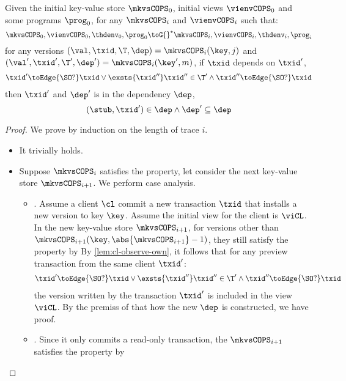 \begin{lemma}
    \label{lem:cops-dep}
    Given the initial key-value store \( \mkvsCOPS_0 \), initial views \( \vienvCOPS_0 \) and some programs \( \prog_0 \), for any \( \mkvsCOPS_i \) and \( \vienvCOPS_i \)  such that: 
    \[
        \mkvsCOPS_0, \vienvCOPS_0, \thdenv_0, \prog_0 {\toG{}}^* \mkvsCOPS_i, \vienvCOPS_i, \thdenv_i, \prog_i 
    \]
    for any versions \( ( \val,\txid,\T,\dep ) = \mkvsCOPS_i(\key,j) \) and \( ( \val',\txid',\T',\dep' ) = \mkvsCOPS_i(\key',m) \), if \( \txid \) depends on \( \txid' \), \ie
    \[
        \begin{array}{@{}l@{}}
            \txid' \toEdge{\SO ?} \txid
            \lor \exsts{\txid''}
            \txid'' \in \T' \land
            \txid'' \toEdge{\SO ?} \txid
        \end{array}
    \]
    then \( \txid' \) and \( \dep' \) is in the dependency \( \dep \), \ie
    \[
        (\stub, \txid') \in \dep \land \dep' \subseteq \dep
    \]
\end{lemma}
\begin{proof}
    We prove by induction on the length of trace \( i \).
    \begin{itemize}
        \item 
        It trivially holds.
        \item  
        Suppose \( \mkvsCOPS_i \) satisfies the property, let consider the next key-value store \( \mkvsCOPS_{i+1}\).
        We perform case analysis.
        \begin{itemize}
            \item 
            .
            Assume a client \( \cl \) commit a new transaction \( \txid \) that installs a new version to key \( \key \).
            Assume the initial view for the client is \( \viCL \).
            In the new key-value store \( \mkvsCOPS_{i+1} \), for versions other than \( \mkvsCOPS_{i+1}(\key, \abs{\mkvsCOPS_{i+1}} - 1 ) \), they still satisfy the property by \ih
            By \cref{lem:cl-observe-own}, it follows that for any preview transaction from the same client \( \txid' \):
            \[
                \begin{array}{@{}l@{}}
                    \txid' \toEdge{\SO ?} \txid
                    \lor \exsts{\txid''}
                    \txid'' \in \T' \land
                    \txid'' \toEdge{\SO ?} \txid
                \end{array}
            \]
            the version written by the transaction \( \txid' \) is included in the view \( \viCL \).
            By the premiss of  that how the new \( \dep \) is constructed, we have proof.

            \item 
            .
            Since it only commits a read-only transaction, 
            the \( \mkvsCOPS_{i+1} \)  satisfies the property by \ih
        \end{itemize}
    \end{itemize}
\end{proof}

